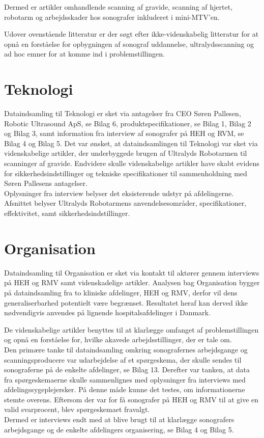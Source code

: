 Dermed er artikler omhandlende scanning af gravide, scanning af hjertet, robotarm og arbejdsskader hos sonografer inkluderet i mini-MTV'en.

Udover ovenstående litteratur er der søgt efter ikke-videnskabelig litteratur for at opnå en forståelse for opbygningen af sonograf uddannelse, ultralydsscanning og ad hoc emner for at komme ind i problemstillingen. 

\section{Teknologi}
Dataindsamling til Teknologi er sket via antagelser fra CEO Søren Pallesen, Robotic Ultrasound ApS, se Bilag 6, produktspecifikationer, se Bilag 1, Bilag 2 og Bilag 3, samt information fra interview af sonografer på HEH og RVM, se Bilag 4 og Bilag 5. Det var ønsket, at dataindsamlingen til Teknologi var sket via videnskabelige artikler, der underbyggede brugen af Ultralyds Robotarmen til scanninger af gravide.
Endvidere skulle videnskabelige artikler have skabt evidens for sikkerhedsindstillinger og tekniske specifikationer til sammenholdning med Søren Pallesens antagelser.\\
Oplysninger fra interview belyser det eksisterende udstyr på afdelingerne. Afsnittet belyser Ultralyds Robotarmens anvendelsesområder, specifikationer, effektivitet, samt sikkerhedsindstillinger.

\section{Organisation}
Dataindsamling til Organisation er sket via kontakt til aktører gennem interviews på HEH og RMV samt videnskadelige artikler. Analysen bag Organisation bygger på dataindsamling fra to kliniske afdelinger, HEH og RMV, derfor vil dens generaliserbarhed potentielt være begrænset. Resultatet heraf kan derved ikke nødvendigvis anvendes på lignende hospitalsafdelinger i Danmark. 

De videnskabelige artikler benyttes til at klarlægge omfanget af problemstillingen og opnå en forståelse for, hvilke akavede arbejdsstillinger, der er tale om. \\
Den primære tanke til dataindsamling omkring sonografernes arbejdsgange og scanningsproducere var udarbejdelse af et spørgeskema, der skulle sendes til sonograferne på de enkelte afdelinger, se Bilag 13. Derefter var tanken, at data fra spørgeskemaerne skulle sammenlignes med oplysninger fra interviews med afdelingssygeplejersker. På denne måde kunne det testes, om informationerne stemte overens. Eftersom der var for få sonografer på HEH og RMV til at give en valid svarprocent, blev spørgeskemaet fravalgt. \\
Dermed er interviews endt med at blive brugt til at klarlægge sonografers arbejdsgange og de enkelte afdelingers organisering, se Bilag 4 og Bilag 5. 

